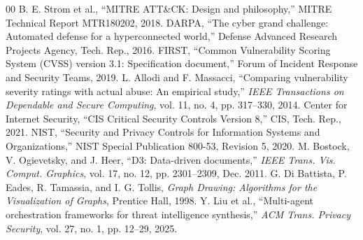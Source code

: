 \documentclass[conference]{IEEEtran}
\begin{document}
\begin{thebibliography}{00}
 B. E. Strom et al., ``MITRE ATT\&CK: Design and philosophy,'' MITRE Technical Report MTR180202, 2018.
 DARPA, ``The cyber grand challenge: Automated defense for a hyperconnected world,'' Defense Advanced Research Projects Agency, Tech. Rep., 2016.
 FIRST, ``Common Vulnerability Scoring System (CVSS) version 3.1: Specification document,'' Forum of Incident Response and Security Teams, 2019.
 L. Allodi and F. Massacci, ``Comparing vulnerability severity ratings with actual abuse: An empirical study,'' \textit{IEEE Transactions on Dependable and Secure Computing}, vol. 11, no. 4, pp. 317--330, 2014.
 Center for Internet Security, ``CIS Critical Security Controls Version 8,'' CIS, Tech. Rep., 2021.
 NIST, ``Security and Privacy Controls for Information Systems and Organizations,'' NIST Special Publication 800-53, Revision 5, 2020.
 M. Bostock, V. Ogievetsky, and J. Heer, ``D3: Data-driven documents,'' \textit{IEEE Trans. Vis. Comput. Graphics}, vol. 17, no. 12, pp. 2301--2309, Dec. 2011.
 G. Di Battista, P. Eades, R. Tamassia, and I. G. Tollis, \textit{Graph Drawing: Algorithms for the Visualization of Graphs}, Prentice Hall, 1998.
 Y. Liu et al., ``Multi-agent orchestration frameworks for threat intelligence synthesis,'' \textit{ACM Trans. Privacy Security}, vol. 27, no. 1, pp. 12--29, 2025.
\end{thebibliography}
\end{document}
